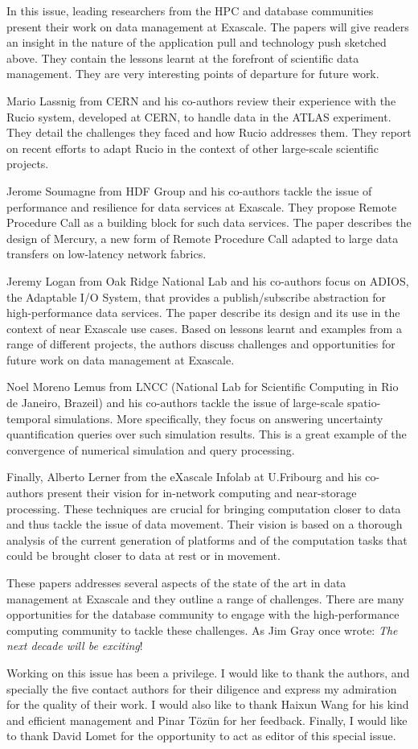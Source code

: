 \documentclass[11pt]{article}
\begin{document}
In this issue, leading researchers from the HPC and database communities present their work on data management 
at Exascale. The papers will give readers an insight in the nature of the application pull and technology push
sketched above. They contain the lessons learnt at the forefront of scientific data management. They are very
interesting points of departure for future work.

Mario Lassnig from CERN and his co-authors review their experience with the Rucio system, developed at CERN,
to handle data in the ATLAS experiment. They detail the challenges they faced and how Rucio addresses
them. They report on recent efforts to adapt Rucio in the context of other large-scale scientific projects.

Jerome Soumagne from HDF Group and his co-authors tackle the issue of performance and resilience for data services at Exascale.
They propose Remote Procedure Call as a building block for such data services. The paper describes the design
of Mercury, a new form of Remote Procedure Call adapted to large data transfers on low-latency network fabrics. 

Jeremy Logan from Oak Ridge National Lab and his co-authors focus on ADIOS, the Adaptable I/O System, that
provides a publish/subscribe abstraction for high-performance data services. The paper describe its design and
its use in the context of near Exascale use cases. Based on lessons learnt and examples from a range of different
projects, the authors discuss challenges and opportunities for future work on data management at Exascale.

Noel Moreno Lemus from LNCC (National Lab for Scientific Computing in Rio de Janeiro, Brazeil) and his co-authors tackle the issue of large-scale spatio-temporal simulations. More specifically,
they focus on answering uncertainty quantification queries over such simulation results. This is a great
example of the convergence of numerical simulation and query processing.

Finally, Alberto Lerner from the eXascale Infolab at U.Fribourg and his co-authors present their
vision for in-network computing and near-storage processing. These techniques are crucial for bringing
computation closer to data and thus tackle the issue of data movement. Their vision is based on a thorough analysis
of the current generation of platforms and of the computation tasks that could be brought closer to data at rest
or in movement.

These papers addresses several aspects of the state of the art in data management at Exascale and
they outline a range of challenges. There
are many opportunities for the database community to engage with the high-performance computing community
to tackle these challenges. As Jim Gray once wrote: {\em The next decade will be exciting}! 

Working on this issue has been a privilege. I would like to thank the authors, and specially the five contact
authors for their diligence and express my admiration for the quality of their work. I would also like to thank
Haixun Wang for his kind and efficient management and Pinar Tözün for her feedback. Finally, 
I would like to thank David Lomet for the opportunity
to act as editor of this special issue.
\end{document}
